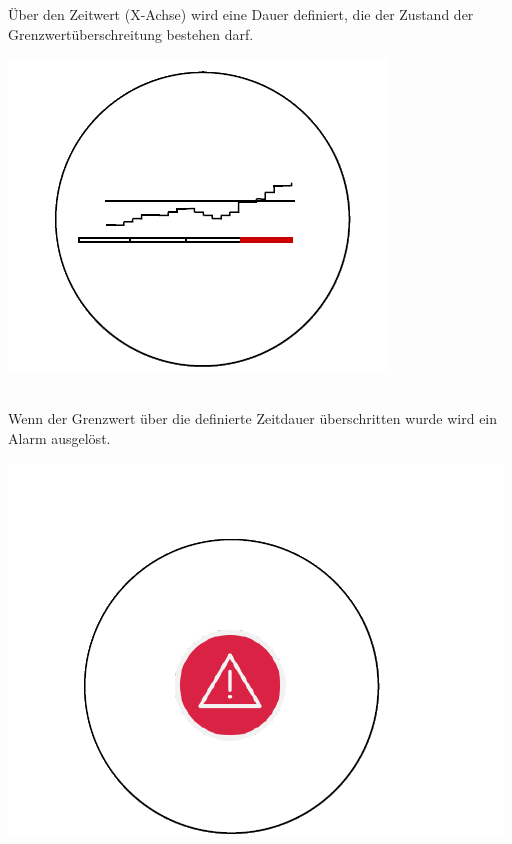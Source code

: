 \documentclass[a4paper,10pt]{scrartcl}
\begin{document}
Über den Zeitwert (X-Achse) wird eine Dauer definiert, die der Zustand der Grenzwertüberschreitung bestehen darf.\\

\begin{minipage}{\linewidth}
  \includegraphics[scale=.3]{img/Datenaggregation/GrafAlarmNew.png} 
\end{minipage}\\

Wenn der Grenzwert über die definierte Zeitdauer überschritten wurde wird ein Alarm ausgelöst.\\

\begin{minipage}{\linewidth}
  \includegraphics[scale=.3]{img/Datenaggregation/AlarmNew.png}  
\end{minipage} \\
\end{document}

